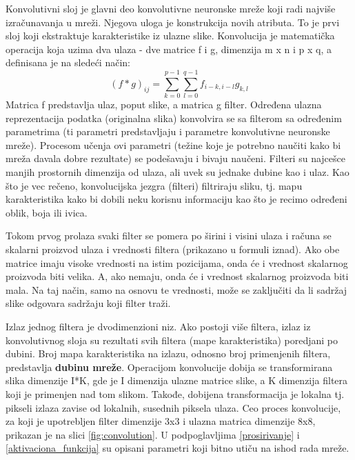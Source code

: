 \documentclass[a4paper]{article}
\begin{document}
Konvolutivni sloj je glavni deo konvolutivne neuronske mreže koji radi najviše izračunavanja u mreži. Njegova uloga je konstrukcija novih atributa. To je prvi sloj koji ekstraktuje karakteristike iz ulazne slike. Konvolucija je matematička operacija koja uzima dva ulaza - dve matrice f i g, dimenzija m x n i p x q, a definisana je na sledeći način:
$$(f * g)_{ij} = \sum_{k=0}^{p-1} \sum_{l=0}^{q-1} f_{i-k, i-l}g_{k, l}$$
Matrica f predstavlja ulaz, poput slike, a matrica g filter. Određena ulazna reprezentacija podatka (originalna slika) konvolvira se sa filterom sa određenim parametrima (ti parametri predstavljaju i parametre konvolutivne neuronske mreže). Procesom učenja ovi parametri (težine koje je potrebno naučiti kako bi mreža davala dobre rezultate) se podešavaju i bivaju naučeni. Filteri su najcešce manjih prostornih dimenzija od ulaza, ali uvek su jednake dubine kao i ulaz. Kao što je vec rečeno, konvolucijska jezgra (filteri) filtriraju sliku, tj. mapu karakteristika kako bi dobili neku korisnu informaciju kao što je recimo određeni oblik, boja ili ivica.

Tokom prvog prolaza svaki filter se pomera po širini i visini ulaza i računa se skalarni proizvod ulaza i vrednosti filtera (prikazano u formuli iznad). Ako obe matrice imaju visoke vrednosti na istim pozicijama, onda će i vrednost skalarnog proizvoda biti velika. A, ako nemaju, onda će i vrednost skalarnog proizvoda biti mala. Na taj način, samo na osnovu te vrednosti, može se zaključiti da li sadržaj slike odgovara sadržaju koji filter traži.

Izlaz jednog filtera je dvodimenzioni niz. Ako postoji više filtera, izlaz iz konvolutivnog sloja su rezultati svih filtera (mape karakteristika) poredjani po dubini. Broj mapa karakteristika na izlazu, odnosno broj primenjenih filtera, predstavlja \textbf{dubinu mreže}. Operacijom konvolucije dobija se transformirana slika dimenzije I*K, gde je I dimenzija ulazne matrice slike, a K dimenzija filtera koji je primenjen nad tom slikom. Takođe, dobijena transformacija je lokalna tj. pikseli izlaza zavise od lokalnih, susednih piksela ulaza. Ceo proces konvolucije, za koji je upotrebljen filter dimenzije 3x3 i ulazna matrica dimenzije 8x8, prikazan je na slici \ref{fig:convolution}. U podpoglavljima \ref{prosirivanje} i \ref{aktivaciona_funkcija} su opisani parametri koji bitno utiču na ishod rada mreže.


\end{document}
